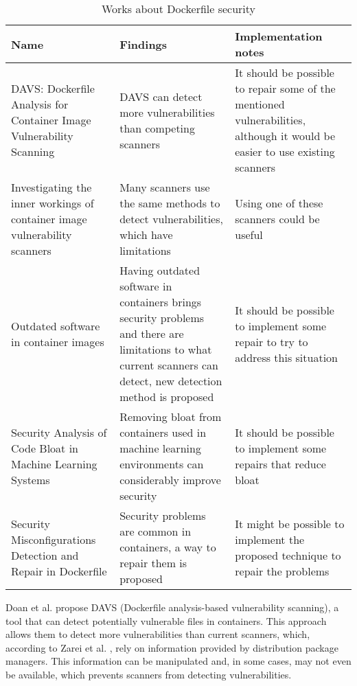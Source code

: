 \begin{table}[H]
    \centering
    \begin{tabular}{|p{}|p{}|p{}|}
        \hline \textbf{Name} & \textbf{Findings} & \textbf{Implementation notes} \\
        \hline DAVS: Dockerfile Analysis for Container Image Vulnerability Scanning \cite{doanDAVSDockerfileAnalysis2022} & DAVS can detect more vulnerabilities than competing scanners & It should be possible to repair some of the mentioned vulnerabilities, although it would be easier to use existing scanners \\
        \hline Investigating the inner workings of container image vulnerability scanners \cite{zareiInvestigatingInnerWorkings2022} & Many scanners use the same methods to detect vulnerabilities, which have limitations & Using one of these scanners could be useful \\
        \hline Outdated software in container images \cite{linnalampiOutdatedSoftwareContainer2021} & Having outdated software in containers brings security problems and there are limitations to what current scanners can detect, new detection method is proposed & It should be possible to implement some repair to try to address this situation \\
        \hline Security Analysis of Code Bloat in Machine Learning Systems \cite{ahmedSecurityAnalysisCode2022} & Removing bloat from containers used in machine learning environments can considerably improve security & It should be possible to implement some repairs that reduce bloat \\
        \hline Security Misconfigurations Detection and Repair in Dockerfile \cite{prinettoSecurityMisconfigurationsDetection} & Security problems are common in containers, a way to repair them is proposed & It might be possible to implement the proposed technique to repair the problems \\
        \hline
    \end{tabular}
    \caption{Works about Dockerfile security}
    \label{tab:works_dockerfile_security}
\end{table}

Doan et al. \cite{doanDAVSDockerfileAnalysis2022} propose DAVS (Dockerfile analysis-based vulnerability scanning), a tool that can detect potentially vulnerable files in containers. This approach allows them to detect more vulnerabilities than current scanners, which, according to Zarei et al. \cite{zareiInvestigatingInnerWorkings2022}, rely on information provided by distribution package managers. This information can be manipulated and, in some cases, may not even be available, which prevents scanners from detecting vulnerabilities.

